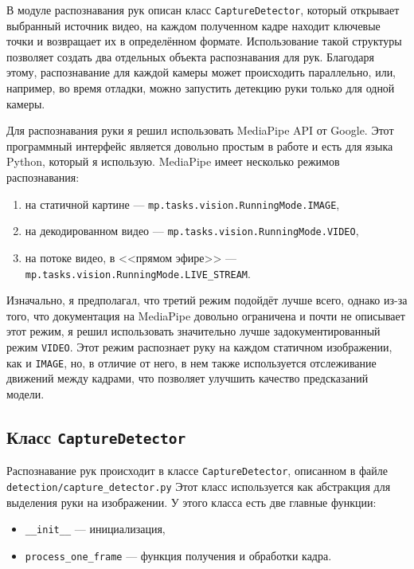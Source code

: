 \documentclass[14pt, a4paper]{extarticle}
\begin{document}
В модуле распознавания рук описан класс \texttt{CaptureDetector}, который
открывает выбранный источник видео, на каждом полученном кадре находит
ключевые точки и возвращает их в определённом формате. Использование такой
структуры позволяет создать два отдельных объекта распознавания для рук.
Благодаря этому, распознавание для каждой камеры может происходить параллельно,
или, например, во время отладки, можно запустить детекцию руки только для одной
камеры.

Для распознавания руки я решил использовать MediaPipe API от Google. Этот
программный интерфейс является довольно простым в работе и есть для языка
Python, который я использую.
MediaPipe имеет несколько режимов распознавания:
\begin{enumerate}
  \item на статичной картине --- \texttt{mp.tasks.vision.RunningMode.IMAGE},
  \item на декодированном видео --- \texttt{mp.tasks.vision.RunningMode.VIDEO},
  \item на потоке видео, в <<прямом эфире>> --- \\\texttt{mp.tasks.vision.RunningMode.LIVE\_STREAM}.
\end{enumerate}

Изначально, я предполагал, что третий режим подойдёт лучше всего, однако из-за
того, что документация на MediaPipe довольно ограничена и почти не описывает
этот режим, я решил использовать значительно лучше задокументированный режим
\texttt{VIDEO}. Этот режим распознает руку на каждом статичном изображении, как
и \texttt{IMAGE}, но, в отличие от него, в нем также используется отслеживание
движений между кадрами, что позволяет улучшить качество предсказаний модели.

\subsection{Класс \texttt{CaptureDetector}}
Распознавание рук происходит в классе \texttt{CaptureDetector}, описанном в файле \\ 
\texttt{detection/capture\_detector.py}
Этот класс используется как абстракция для выделения руки на изображении. У
этого класса есть две главные функции:
\begin{itemize}
  \item \texttt{\_\_init\_\_} --- инициализация,
  \item \texttt{process\_one\_frame} --- функция получения и обработки кадра.
\end{itemize}
\end{document}
